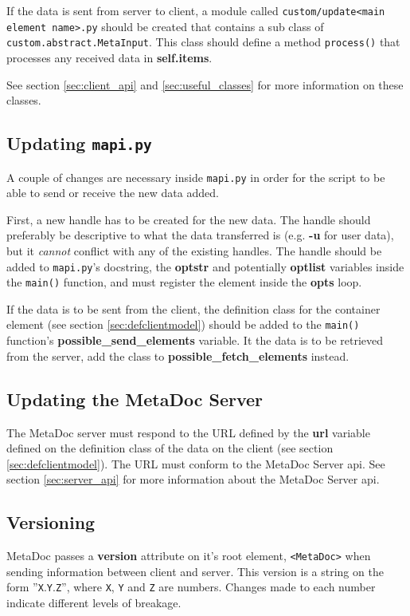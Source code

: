 If the data is sent from server to client, a module called
\texttt{custom/update<main element name>.py} should be created that contains a
sub class of \\ \texttt{custom.abstract.MetaInput}. This class should define a
method \texttt{process()} that processes any received data in
\textbf{self.items}.  

See section \ref{sec:client_api} and \ref{sec:useful_classes} for more
information on these classes.

\subsection{Updating \texttt{mapi.py}}
A couple of changes are necessary inside \texttt{mapi.py} in order for the
script to be able to send or receive the new data added. 

First, a new handle has to be created for the new data. The handle should
preferably be descriptive to what the data transferred is (e.g. \textbf{-u} for
user data), but it \textit{cannot} conflict with any of the existing handles.
The handle should be added to \texttt{mapi.py}'s docstring, the \textbf{optstr}
and potentially \textbf{optlist} variables inside the \texttt{main()} function,
and must register the element inside the \textbf{opts} loop. 

If the data is to be sent from the client, the definition class for the
container element (see section \ref{sec:defclientmodel}) should be added to the
\texttt{main()} function's \textbf{possible\_send\_elements} variable. It the
data is to be retrieved from the server, add the class to
\textbf{possible\_fetch\_elements} instead.

\subsection{Updating the MetaDoc Server}
The MetaDoc server must respond to the URL defined by the \textbf{url} variable
defined on the definition class of the data on the client (see section
\ref{sec:defclientmodel}). The URL must conform to the MetaDoc Server
\gls{api}. See section \ref{sec:server_api} for more information about the
MetaDoc Server \gls{api}.

\subsection{Versioning}
\label{sec:version}
MetaDoc passes a \textbf{version} attribute on it's root element,
\texttt{<MetaDoc>} when sending information between client and server. This
version is a string on the form ''\texttt{X}.\texttt{Y}.\texttt{Z}'', where
\texttt{X}, \texttt{Y} and \texttt{Z} are numbers. Changes made to each number 
indicate different levels of breakage. 

